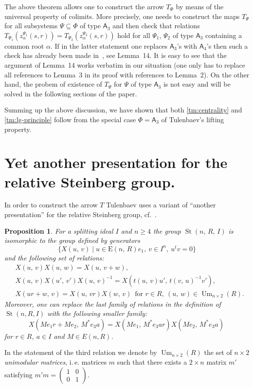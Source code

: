 \documentclass[11pt]{amsart}
\theoremstyle{plain} \declaretheorem[name=Theorem, Refname={Theorem,Theorems}]{tm} \Crefname{tm}{Theorem}{Theorems}
\numberwithin{equation}{section}
\newtheorem{prop}[lm]{Proposition} \Crefname{prop}{Proposition}{Propositions}
\theoremstyle{definition} \newtheorem{df}[lm]{Definition} \Crefname{df}{Definition}{Definitions}
\theoremstyle{remark} \newtheorem{rk}[lm]{Remark} \Crefname{rk}{Remark}{Remarks}
\newcommand{\E}{{\mathrm{E}}}
\newcommand{\Um}{\mathop{\mathrm{Um}}\nolimits}
\newcommand{\St}{\mathop{\mathrm{St}}\nolimits}
\newcommand{\inv}{^{-1}}
\newcommand{\rA}{\mathsf{A}}
\begin{document}
The above theorem allows one to construct the arrow $T_\Phi$ by means of the universal property of colimits.
More precisely, one needs to construct the maps $T_{\Psi}$ for all subsystems $\Psi\subseteq\Phi$ of type $\rA_3$ and then check that
relations $T_{\Psi_1}(z_\alpha^{\Psi_1}(s,r)) = T_{\Psi_2}(z_\alpha^{\Psi_2}(s,r))$ hold for all $\Psi_1$, $\Psi_2$ of type $\rA_3$ containing a common root $\alpha$.
If in the latter statement one replaces $\rA_3$'s with $\rA_4$'s then such a check has already been made in~\cite{SCh}, see Lemma~14.
It is easy to see that the argument of Lemma~14 works verbatim in our situation (one only has to replace all references to Lemma~3 in its proof with references to Lemma~2).
On the other hand, the probem of existence of $T_\Psi$ for $\Psi$ of type $\rA_3$ is not easy and will be solved in the following sections of the paper.

Summing up the above discussion, we have shown that both \cref{tm:centrality} and \cref{tm:lg-principle} follow from the special case $\Phi=\rA_3$ of Tulenbaev's lifting property.

\section{Yet another presentation for the relative Steinberg group.} \label{sec:yap}
In order to construct the arrow $T$ Tulenbaev uses a variant of ``another presentation'' for the relative Steinberg group, cf.~\cite[Proposition~1.6]{Tul}. 
\setcounter{lm}{1}
\begin{prop}\label{prop:TulPres}
For a splitting ideal $I$ and $n\geq 4$ the group $\St(n,\,R,\,I)$ is isomorphic to the group defined by generators
$$\{X(u,\,v)\mid u\in\E(n,\,R)e_1,\ v\in I^n,\ u^tv=0\}$$ and the following set of relations:
\setcounter{equation}{0}
\renewcommand{\theequation}{T\arabic{equation}}
\begin{align}
&X(u,\,v)X(u,\,w)=X(u,\,v+w), \label{add2}\\
&X(u,\,v)X(u',\,v')X(u,\,v)\inv=X(t(u,\,v)u',\,t(v,\,u)\inv v'), \label{conj2}  \\
&X(ur+w,\,v)=X(u,\,vr)X(w,\,v)\,\text{ for }r\in R,\ (u,\,w)\in\Um_{n\times2}(R) \label{add3}.
\end{align}
Moreover, one can replace the last family of relations in the definition of $\St(n, R, I)$ with the following smaller family:
\setcounter{equation}{2} \renewcommand{\theequation}{T\arabic{equation}'}
\begin{equation} X(Me_1r+Me_2,\,M^*e_3a)=X(Me_1,\,M^*e_3ar)X(Me_2,\,M^*e_3a)\, \label{add3'} \end{equation} 
for $r\in R$, $a\in I$ and $M\in E(n, R)$.
\end{prop}
In the statement of the third relation we denote by $\Um_{n\times2}(R)$ the set of $n\times2$ \emph{unimodular matrices},
i.\,e. matrices $m$ such that there exists a $2\times n$ matrix $m'$ satisfying $m'm=\left(\begin{smallmatrix}1&0\\0&1\end{smallmatrix}\right)$.
\end{document}
